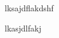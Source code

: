 \documentclass{article}
\begin{document}
\begin{multicols}{2}
\setlength{\columnseprule}{0pt}
\setlength{\premulticols}{1pt}
\setlength{\postmulticols}{1pt}
\setlength{\multicolsep}{1pt}
\setlength{\columnsep}{2pt}

lksajdflakdshf\\

\vfill
\columnbreak

lkasjdlfakj\\

\end{multicols}
\end{document}
